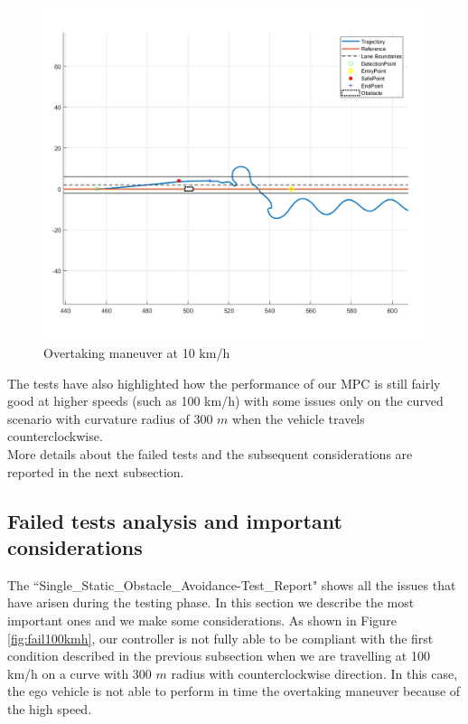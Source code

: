 \begin{figure}[H]
    \centering
    \includegraphics[width=1\textwidth,keepaspectratio]{Figures/Failed10kmh.png}
    \caption{Overtaking maneuver at 10 km/h}
    \label{fig:overtaking_10}
\end{figure}




The tests have also highlighted how the performance of our MPC is still fairly good at higher speeds (such as 100 km/h) with some issues only on the curved scenario with curvature radius of 300 $m$ when the vehicle travels counterclockwise. \\ 
More details about the failed tests and the subsequent considerations are reported in the next subsection.

\subsection{Failed tests analysis and important considerations} \label{subsection:failed_tests}
The ``Single\_Static\_Obstacle\_Avoidance-Test\_Report" shows all the issues that have arisen during the testing phase. In this section we describe the most important ones and we make some considerations.
As shown in Figure \ref{fig:fail100kmh}, our controller is not fully able to be compliant with the first condition described in the previous subsection when we are travelling at 100 km/h on a curve with 300 $m$ radius with counterclockwise direction. In this case, the ego vehicle is not able to perform in time the overtaking maneuver because of the high speed. 

